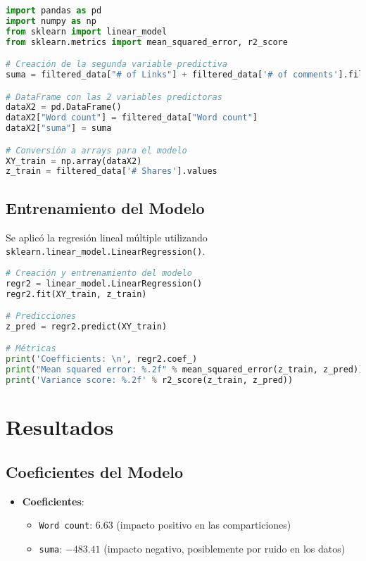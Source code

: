 \documentclass{article}
\begin{document}
\begin{lstlisting}[language=Python, caption=Preparación de datos]
import pandas as pd
import numpy as np
from sklearn import linear_model
from sklearn.metrics import mean_squared_error, r2_score

# Creación de la segunda variable predictiva
suma = filtered_data["# of Links"] + filtered_data['# of comments'].fillna(0) + filtered_data['# Images video']

# DataFrame con las 2 variables predictoras
dataX2 = pd.DataFrame()
dataX2["Word count"] = filtered_data["Word count"]
dataX2["suma"] = suma

# Conversión a arrays para el modelo
XY_train = np.array(dataX2)
z_train = filtered_data['# Shares'].values
\end{lstlisting}

\subsection{Entrenamiento del Modelo}
Se aplicó la regresión lineal múltiple utilizando \texttt{sklearn.linear\_model.LinearRegression()}.

\begin{lstlisting}[language=Python, caption=Entrenamiento del modelo]
# Creación y entrenamiento del modelo
regr2 = linear_model.LinearRegression()
regr2.fit(XY_train, z_train)

# Predicciones
z_pred = regr2.predict(XY_train)

# Métricas
print('Coefficients: \n', regr2.coef_)
print("Mean squared error: %.2f" % mean_squared_error(z_train, z_pred))
print('Variance score: %.2f' % r2_score(z_train, z_pred))
\end{lstlisting}

\section{Resultados}
\subsection{Coeficientes del Modelo}
\begin{itemize}
    \item \textbf{Coeficientes}:
    \begin{itemize}
        \item \texttt{Word count}: $6.63$ (impacto positivo en las comparticiones)
        \item \texttt{suma}: $-483.41$ (impacto negativo, posiblemente por ruido en los datos)
    \end{itemize}
\end{itemize}
\end{document}
